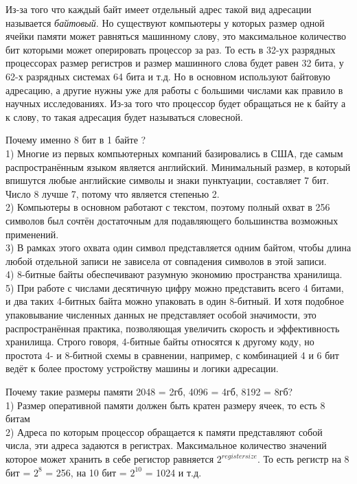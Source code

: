 	\par Из-за того что каждый байт имеет отдельный адрес такой вид адресации называется \textit{байтовый}. Но существуют компьютеры у которых размер одной ячейки памяти может равняться машинному слову, это максимальное количество бит которыми может оперировать процессор за раз. То есть в 32-ух разрядных процессорах размер регистров и размер машинного слова будет равен 32 бита, у 62-х разрядных системах 64 бита и т.д. Но в основном используют байтовую адресацию, а другие нужны уже для работы с большими числами как правило в научных исследованиях. Из-за того что процессор будет обращаться не к байту а к слову, то такая адресация будет называться словесной.
	
	\par Почему именно 8 бит в 1 байте ? 
	\\
	1) Многие из первых компьютерных компаний базировались в США, где самым распространённым языком является английский. Минимальный размер, в который впишутся любые английские символы и знаки пунктуации, составляет 7 бит. Число 8 лучше 7, потому что является степенью 2.
	\\
	2) Компьютеры в основном работают с текстом, поэтому полный охват в 256 символов был сочтён достаточным для подавляющего большинства возможных применений.
	\\
	3) В рамках этого охвата один символ представляется одним байтом, чтобы длина любой отдельной записи не зависела от совпадения символов в этой записи.
	\\ 
	4) 8-битные байты обеспечивают разумную экономию пространства хранилища.
	\\
	5) При работе с числами десятичную цифру можно представить всего 4 битами, и два таких 4-битных байта можно упаковать в один 8-битный. И хотя подобное упаковывание численных данных не представляет особой значимости, это распространённая практика, позволяющая увеличить скорость и эффективность хранилища. Строго говоря, 4-битные байты относятся к другому коду, но простота 4- и 8-битной схемы в сравнении, например, с комбинацией 4 и 6 бит ведёт к более простому устройству машины и логики адресации.

	
	\par Почему такие размеры памяти 2048 = 2гб, 4096 = 4гб, 8192 = 8гб? 
	\\
	1) Размер оперативной памяти должен быть кратен размеру ячеек, то есть 8 битам
	\\
	2) Адреса по которым процессор обращается к памяти представляют собой числа, эти адреса задаются в регистрах. Максимальное количество значений которое может хранить в себе регистор равняется \(2^{register size}\). То есть регистр на 8 бит = \(2^8\) = 256, на 10 бит = \(2^{10}\) = 1024 и т.д.
	
